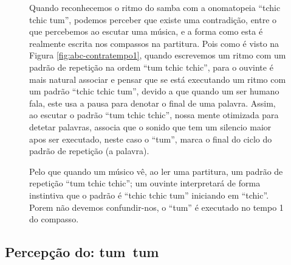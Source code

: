 \begin{figure}[!h]
\begin{elaboracion}[title=Samba: Ritmo vs. Fala]
Quando reconhecemos o ritmo do samba com a onomatopeia ``tchic tchic tum'', 
podemos perceber que existe uma contradição, entre 
o que percebemos ao escutar uma música, e a forma como esta é realmente escrita nos compassos na partitura.
Pois como é visto na Figura \ref{fig:abc-contratempo1}, quando escrevemos
um ritmo com um padrão de repetição na ordem ``tum tchic tchic'', 
para o ouvinte é mais natural associar e pensar
que se está executando um ritmo com um padrão ``tchic tchic tum'', 
devido a que quando um ser humano fala, este usa a pausa
para denotar o final de uma palavra. Assim, ao escutar o padrão ``tum tchic tchic'', 
nossa mente otimizada para detetar palavras,
associa que o sonido que tem um silencio maior apos ser executado,
neste caso o ``tum'', marca o final do ciclo do padrão de repetição (a palavra). 

Pelo que quando um músico vê, ao ler uma partitura, 
um padrão de repetição ``tum tchic tchic''; 
um ouvinte interpretará de forma instintiva que o padrão é ``tchic tchic tum'' iniciando em ``tchic''.
Porem não devemos confundir-nos, o ``tum'' é executado no tempo 1 do compasso.
\end{elaboracion}
\label{fig:RitmoVsFala}
\end{figure}

\subsection{Percepção do: tum~tum}

